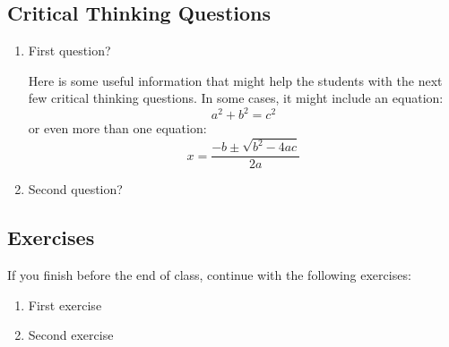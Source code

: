 \subsection*{Critical Thinking Questions}

	\begin{enumerate}
		\item First question?
		
			\answerspace{1in}
		
		\begin{mdframed}[style=infoboxstyle]
			Here is some useful information that might help the students with the next few critical thinking questions.
			In some cases, it might include an equation:
			\begin{equation*}
				a^2 + b^2 = c^2
			\end{equation*}
			or even more than one equation:
			\begin{equation*}
				x=\frac{-b \pm \sqrt{b^2-4ac}}{2a}
			\end{equation*}
		\end{mdframed}		
		
		\item Second question?
		
			\answerspace{1in}
	\end{enumerate}

\subsection*{Exercises}

	If you finish before the end of class, continue with the following exercises:
	
	\begin{enumerate}
		\item First exercise
		\item Second exercise
	\end{enumerate}